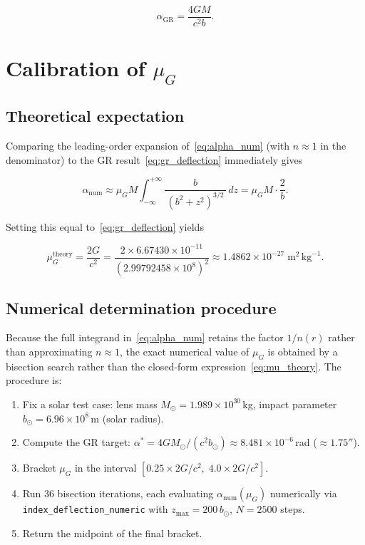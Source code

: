 \documentclass{article}
\begin{document}
\begin{equation}
  \alpha_{\mathrm{GR}} = \frac{4GM}{c^2 b}.
  \label{eq:gr_deflection}
\end{equation}

\section{Calibration of $\mu_G$}
\label{sec:mu}

\subsection{Theoretical expectation}

Comparing the leading-order expansion of~\eqref{eq:alpha_num} (with $n \approx 1$
in the denominator) to the GR result~\eqref{eq:gr_deflection} immediately gives

\begin{equation}
  \alpha_{\mathrm{num}} \approx
  \mu_G M \int_{-\infty}^{+\infty} \frac{b}{\,(b^2+z^2)^{3/2}\,}\, dz
  = \mu_G M \cdot \frac{2}{b}.
\end{equation}

Setting this equal to~\eqref{eq:gr_deflection} yields

\begin{equation}
  \mu_G^{\mathrm{theory}} = \frac{2G}{c^2}
  = \frac{2 \times 6.67430\times10^{-11}}{(2.99792458\times10^8)^2}
  \approx 1.4862 \times 10^{-27}\;\text{m}^2\,\text{kg}^{-1}.
  \label{eq:mu_theory}
\end{equation}

\subsection{Numerical determination procedure}

Because the full integrand in~\eqref{eq:alpha_num} retains the factor
$1/n(r)$ rather than approximating $n \approx 1$, the exact numerical value
of $\mu_G$ is obtained by a bisection search rather than the closed-form
expression~\eqref{eq:mu_theory}.  The procedure is:

\begin{enumerate}
  \item Fix a solar test case: lens mass $M_\odot = 1.989\times10^{30}$\,kg,
        impact parameter $b_\odot = 6.96\times10^8$\,m (solar radius).
  \item Compute the GR target:
        $\alpha^* = 4GM_\odot/(c^2 b_\odot) \approx 8.481\times10^{-6}$\,rad
        ($\approx 1.75''$).
  \item Bracket $\mu_G$ in the interval
        $[0.25 \times 2G/c^2,\; 4.0 \times 2G/c^2]$.
  \item Run 36 bisection iterations, each evaluating
        $\alpha_{\mathrm{num}}(\mu_G)$ numerically via
        \texttt{index\_deflection\_numeric} with
        $z_{\max} = 200\,b_\odot$, $N = 2500$ steps.
  \item Return the midpoint of the final bracket.
\end{enumerate}
\end{document}
